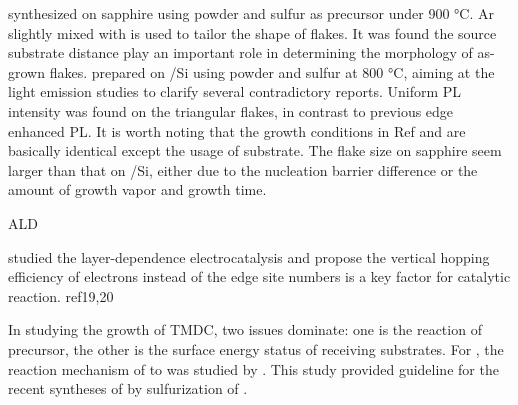 \citeauthor{Zhang2013h} synthesized  on sapphire using  powder and sulfur as precursor under 900 \si{\degreeCelsius}.  \cite{Zhang2013h} Ar slightly mixed with  is used to tailor the shape of  flakes. It was found the source substrate distance play an important role in determining the morphology of as-grown flakes. \citeauthor{Peimyoo2013} prepared  on /Si using  powder and sulfur at 800 \si{\degreeCelsius}, aiming at the light emission studies to clarify several contradictory reports.\cite{Peimyoo2013} Uniform PL intensity was found on the triangular  flakes, in contrast to previous edge enhanced PL.\cite{Berkdemir2013} It is worth noting that the growth conditions in Ref \cite{Peimyoo2013} and \cite{Zhang2013h} are basically identical except the usage of substrate. The flake size on sapphire seem larger than that on /Si, either due to the nucleation barrier difference or the amount of growth vapor and growth time.


\cite{Song2013} ALD 


\citeauthor{Cao2014} studied the layer-dependence  electrocatalysis and propose the vertical hopping efficiency of electrons instead of the edge site numbers is a key factor for catalytic reaction.\cite{Cao2014} ref19,20

In studying the growth of TMDC, two issues dominate: one is the reaction of precursor, the other is the surface energy status of receiving substrates. For , the reaction mechanism of  to  was studied by \citeauthor{Weber1996}.\cite{Weber1996} This study provided guideline for the recent syntheses of  by sulfurization of . \cite{Lin2012,Lee2012b,Liu2012a}

